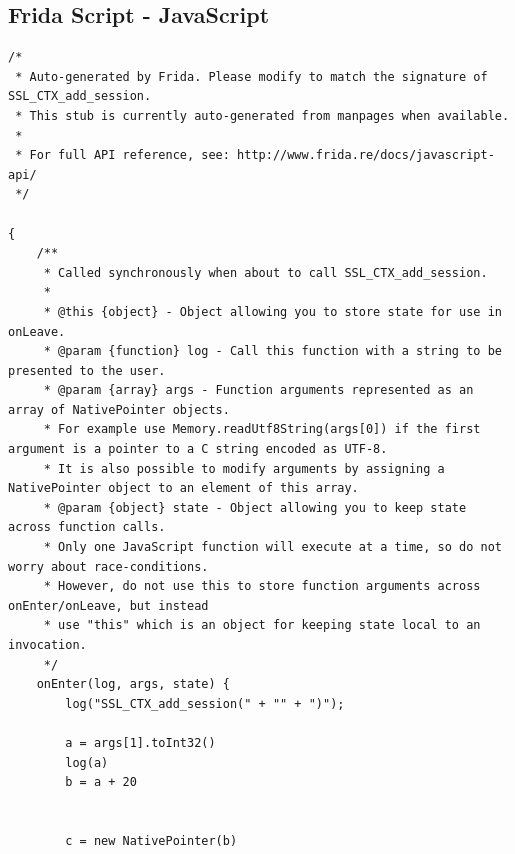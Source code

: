 \documentclass[12pt, a4paper]{report}
\begin{document}
\begin{appendices}

\chapter{}
\section{Frida Script - JavaScript}


 

\begin{lstlisting}[frame=single, breaklines=true]
/*
 * Auto-generated by Frida. Please modify to match the signature of SSL_CTX_add_session.
 * This stub is currently auto-generated from manpages when available.
 *
 * For full API reference, see: http://www.frida.re/docs/javascript-api/
 */

{
    /**
     * Called synchronously when about to call SSL_CTX_add_session.
     *
     * @this {object} - Object allowing you to store state for use in onLeave.
     * @param {function} log - Call this function with a string to be presented to the user.
     * @param {array} args - Function arguments represented as an array of NativePointer objects.
     * For example use Memory.readUtf8String(args[0]) if the first argument is a pointer to a C string encoded as UTF-8.
     * It is also possible to modify arguments by assigning a NativePointer object to an element of this array.
     * @param {object} state - Object allowing you to keep state across function calls.
     * Only one JavaScript function will execute at a time, so do not worry about race-conditions.
     * However, do not use this to store function arguments across onEnter/onLeave, but instead
     * use "this" which is an object for keeping state local to an invocation.
     */
    onEnter(log, args, state) {
        log("SSL_CTX_add_session(" + "" + ")");

		a = args[1].toInt32()
		log(a)
		b = a + 20


		c = new NativePointer(b)


\end{lstlisting}
\end{appendices}
\end{document}
